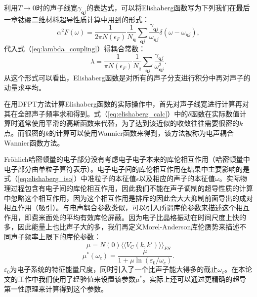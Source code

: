 利用$T\rightarrow 0$时的声子线宽$\gamma_{\bm{q}j}$的表达式，可以将Elishaberg函数写为下列我们在最后一章钛硼二维材料超导性质计算中用到的形式：
\begin{equation}\label{eq:elishaberg_calc}
  \alpha^2 F(\omega) = \frac{1}{2\pi N(\epsilon_F)}\frac{1}{N_{\bm{q}}}
  \sum_{\bm{q}j} \frac{\gamma_{\bm{q}j}}{\omega_{\bm{q}j}}
  \delta(\omega-\omega_{\bm{q}j}),
\end{equation}
代入式（\ref{eq:lambda_coupling}）得耦合常数：
\begin{equation}
  \lambda = \frac{1}{\pi N(\epsilon_F)}\frac{1}{N_q}
  \sum_{\bm{q}j}\frac{\gamma_{\bm{q}j}}{\omega^2_{\bm{q}j}}.
\end{equation}
从这个形式可以看出，Elishaberg函数是对所有的声子分支进行积分中再对声子的动量求平均。

在用DFPT方法计算Elishaberg函数的实际操作中，首先对声子线宽进行计算再对其在全部声子频率求和得到。式（\ref{eq:elishaberg_calc}）中的$\delta$函数在实际数值计算时通常使用平滑的高斯函数来代替，为了达到该近似的收敛往往需要很密的$k$点。而很密的$k$的计算可以使用Wannier函数来得到，该方法被称为电声耦合Wannier函数方法\cite{ponce2016epw}。

Fr{\"o}hlich哈密顿量的电子部分没有考虑电子电子本来的库伦相互作用（哈密顿量中电子部分由单粒子算符表示）。电子电子间的库伦相互作用在结果中主要影响的是式（\ref{eq:elishaberg_iso}）中准粒子的本征值$\epsilon$以及相应的声子的本征值$\omega$。实际物理过程包含有电子间的库伦相互作用，因此我们不能在声子调制的超导性质的计算中忽略这个相互作用，因为这个相互作用是排斥的因此会大大抑制前面导出的成对相互作用（吸引）。与电声耦合参数类似，可以引入所谓库伦参数来描述这个相互作用，即费米面处的平均有效库伦屏蔽。因为电子比晶格振动在时间尺度上快的多，因此能量上也比声子大的多，我们再定义Morel-Anderson库伦赝势\cite{morel1962calculation}来描述不同声子频率上限下的库伦参数：
\begin{equation}
  \mu = N(0)\langle\langle {V_C(k,k')} \rangle\rangle_{FS}
\end{equation}
\begin{equation}
  \mu^*(\omega_c) = \frac{\mu}{1+\mu \ln(\varepsilon_0/\omega_c)}.
\end{equation}
$\varepsilon_0$为电子系统的特征能量尺度，同时引入了一个比声子能大得多的截止$\omega_c$。在本论文的工作中我们使用了经验值来设置该参数$\mu^*$。实际上还可以通过更精确的超导第一性原理来计算得到这个参数\cite{kohn1989orbital}。

